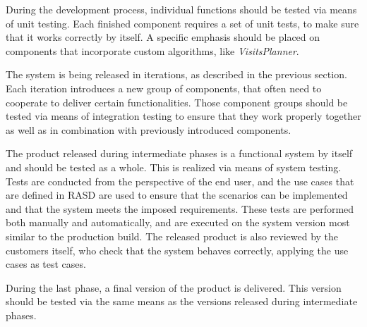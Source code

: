 During the development process, individual functions should be tested via means of unit testing. Each finished component requires a set of unit tests, to make sure that it works correctly by itself. A specific emphasis should be placed on components that incorporate custom algorithms, like \textit{VisitsPlanner}. 

The system is being released in iterations, as described in the previous section. Each iteration introduces a new group of components, that often need to cooperate to deliver certain functionalities. Those component groups should be tested via means of integration testing to ensure that they work properly together as well as in combination with previously introduced components.

The product released during intermediate phases is a functional system by itself and should be tested as a whole. This is realized via means of system testing. Tests are conducted from the perspective of the end user, and the use cases that are defined in RASD are used to ensure that the scenarios can be implemented and that the system meets the imposed requirements. These tests are performed both manually and automatically, and are executed on the system version most similar to the production build. The released product is also reviewed by the customers itself, who check that the system behaves correctly, applying the use cases as test cases. 

During the last phase, a final version of the product is delivered. This version should be tested via the same means as the versions released during intermediate phases.


 